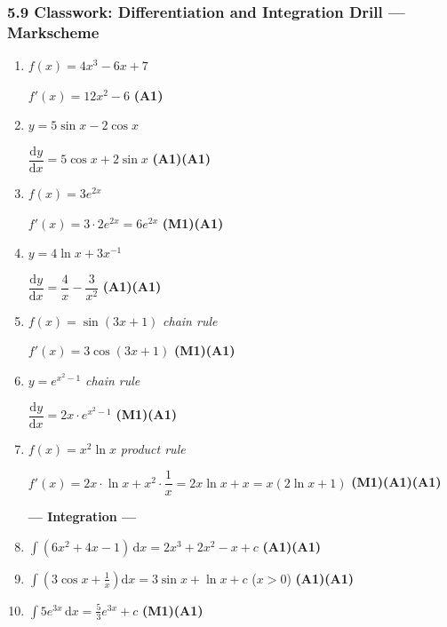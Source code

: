 \documentclass[12pt, twoside]{article}
\begin{document}
\subsubsection*{5.9 Classwork: Differentiation and Integration Drill --- Markscheme}

\begin{enumerate}[itemsep=0.4cm]

\textbf{--- Differentiation ---}

\item $f(x) = 4x^3 - 6x + 7$

$f'(x) = 12x^2 - 6$ \hfill \textbf{(A1)}

\item $y = 5\sin x - 2\cos x$

$\dfrac{\mathrm{d}y}{\mathrm{d}x} = 5\cos x + 2\sin x$ \hfill \textbf{(A1)(A1)}

\item $f(x) = 3e^{2x}$

$f'(x) = 3 \cdot 2e^{2x} = 6e^{2x}$ \hfill \textbf{(M1)(A1)}

\item $y = 4\ln x + 3x^{-1}$

$\dfrac{\mathrm{d}y}{\mathrm{d}x} = \dfrac{4}{x} - \dfrac{3}{x^2}$
\hfill \textbf{(A1)(A1)}

\item $f(x) = \sin(3x + 1)$ \hfill \emph{chain rule}

$f'(x) = 3\cos(3x + 1)$ \hfill \textbf{(M1)(A1)}

\item $y = e^{x^2 - 1}$ \hfill \emph{chain rule}

$\dfrac{\mathrm{d}y}{\mathrm{d}x} = 2x \cdot e^{x^2 - 1}$
\hfill \textbf{(M1)(A1)}

\item $f(x) = x^2 \ln x$ \hfill \emph{product rule}

$f'(x) = 2x \cdot \ln x + x^2 \cdot \dfrac{1}{x} = 2x\ln x + x = x(2\ln x + 1)$
\hfill \textbf{(M1)(A1)(A1)}

\bigskip
\textbf{--- Integration ---}

\item $\displaystyle\int (6x^2 + 4x - 1)\,\mathrm{d}x = 2x^3 + 2x^2 - x + c$
\hfill \textbf{(A1)(A1)}

\item $\displaystyle\int \!\left(3\cos x + \frac{1}{x}\right)\mathrm{d}x
= 3\sin x + \ln x + c$ \quad ($x > 0$)
\hfill \textbf{(A1)(A1)}

\item $\displaystyle\int 5e^{3x}\,\mathrm{d}x = \frac{5}{3}e^{3x} + c$
\hfill \textbf{(M1)(A1)}


\end{enumerate}
\end{document}
